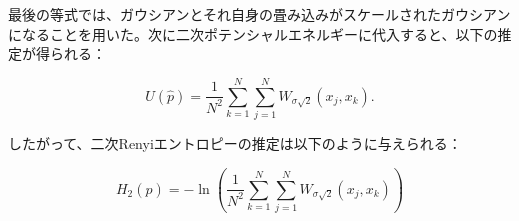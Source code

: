 \documentclass[dvipdfmx,a4paper]{jsarticle}%
\begin{document}
\begin{dfn}

最後の等式では、ガウシアンとそれ自身の畳み込みがスケールされたガウシアンになることを用いた。次に二次ポテンシャルエネルギーに代入すると、以下の推定が得られる：

$$U(\hat{p}) = \frac{1}{N^2} \sum_{k=1}^N \sum_{j=1}^N W_{\sigma\sqrt{2}}(x_j, x_k).$$

したがって、二次Renyiエントロピーの推定は以下のように与えられる：

$$H_2(\hat{p}) = -\ln \left( \frac{1}{N^2} \sum_{k=1}^N \sum_{j=1}^N W_{\sigma\sqrt{2}}(x_j, x_k) \right)$$
\end{dfn}
\end{document}
